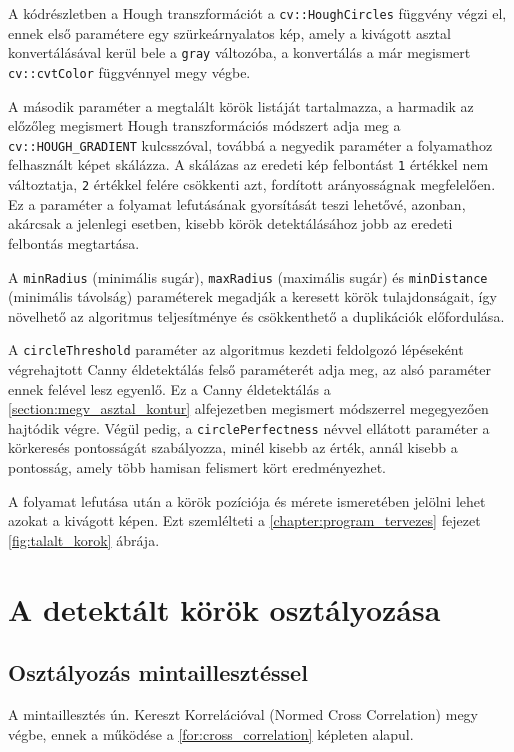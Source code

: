 \par A kódrészletben a Hough transzformációt a \lstinline{cv::HoughCircles} függvény\cite{opencv_docs} végzi el, ennek első paramétere egy szürkeárnyalatos kép, amely a kivágott asztal konvertálásával kerül bele a \lstinline{gray} változóba, a konvertálás a már megismert \lstinline{cv::cvtColor} függvénnyel\cite{opencv_docs} megy végbe.
\par A második paraméter a megtalált körök listáját tartalmazza, a harmadik az előzőleg megismert Hough transzformációs módszert\cite{opencv_docs,hough_transform,YUEN199071} adja meg a \lstinline{cv::HOUGH_GRADIENT} kulcsszóval, továbbá a negyedik paraméter a folyamathoz felhasznált képet skálázza. A skálázas az eredeti kép felbontást \lstinline{1} értékkel nem változtatja, \lstinline{2} értékkel felére csökkenti azt, fordított arányosságnak megfelelően\cite{opencv_docs}. Ez a paraméter a folyamat lefutásának gyorsítását teszi lehetővé, azonban, akárcsak a jelenlegi esetben, kisebb körök detektálásához jobb az eredeti felbontás megtartása.
\par A \lstinline{minRadius} (minimális sugár), \lstinline{maxRadius} (maximális sugár) és \lstinline{minDistance} (minimális távolság) paraméterek megadják a keresett körök tulajdonságait, így növelhető az algoritmus teljesítménye és csökkenthető a duplikációk előfordulása.
\par A \lstinline{circleThreshold} paraméter az algoritmus kezdeti feldolgozó lépéseként végrehajtott Canny éldetektálás felső paraméterét adja meg, az alsó paraméter ennek felével lesz egyenlő. Ez a Canny éldetektálás a \ref{section:megv_asztal_kontur} alfejezetben megismert módszerrel megegyezően hajtódik végre. Végül pedig, a \lstinline{circlePerfectness} névvel ellátott paraméter a körkeresés pontosságát szabályozza, minél kisebb az érték, annál kisebb a pontosság, amely több hamisan felismert kört eredményezhet.
\par A folyamat lefutása után a körök pozíciója és mérete ismeretében jelölni lehet azokat a kivágott képen. Ezt szemlélteti a \ref{chapter:program_tervezes} fejezet \ref{fig:talalt_korok} ábrája.

\section{A detektált körök osztályozása}

\subsection{Osztályozás mintaillesztéssel}
\label{subsection:mintaillesztes_osztalyozas}
A mintaillesztés ún. Kereszt Korrelációval (Normed Cross Correlation) megy végbe, ennek a működése a \ref{for:cross_correlation} képleten alapul\cite{kaehler2016learning, opencv_docs}.

